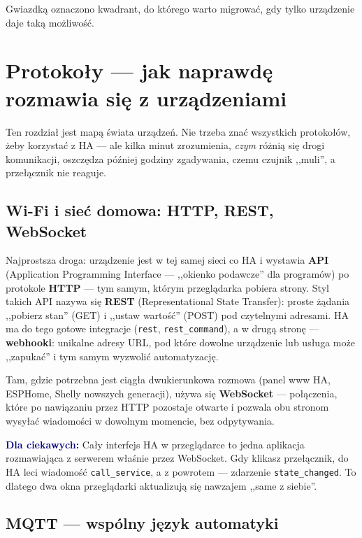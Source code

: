 \documentclass[11pt,a4paper]{article}
\newcommand{\ciekawostka}[1]{\par\medskip\noindent\textcolor{navy}{\textbf{Dla ciekawych:}} #1\par\medskip}
\begin{document}
Gwiazdką oznaczono kwadrant, do którego warto migrować, gdy tylko urządzenie daje taką możliwość.

\section{Protokoły --- jak naprawdę rozmawia się z urządzeniami}
\label{sec:protokoly}

Ten rozdział jest mapą świata urządzeń. Nie trzeba znać wszystkich protokołów, żeby korzystać z HA --- ale kilka minut zrozumienia, \emph{czym} różnią się drogi komunikacji, oszczędza później godziny zgadywania, czemu czujnik ,,muli'', a przełącznik nie reaguje.

\subsection{Wi-Fi i sieć domowa: HTTP, REST, WebSocket}

Najprostsza droga: urządzenie jest w tej samej sieci co HA i wystawia \textbf{API} (Application Programming Interface --- ,,okienko podawcze'' dla programów) po protokole \textbf{HTTP} --- tym samym, którym przeglądarka pobiera strony. Styl takich API nazywa się \textbf{REST} (Representational State Transfer): proste żądania ,,pobierz stan'' (GET) i ,,ustaw wartość'' (POST) pod czytelnymi adresami. HA ma do tego gotowe integracje (\texttt{rest}, \texttt{rest\_command}), a w drugą stronę --- \textbf{webhooki}: unikalne adresy URL, pod które dowolne urządzenie lub usługa może ,,zapukać'' i tym samym wyzwolić automatyzację.

Tam, gdzie potrzebna jest ciągła dwukierunkowa rozmowa (panel www HA, ESPHome, Shelly nowszych generacji), używa się \textbf{WebSocket} --- połączenia, które po nawiązaniu przez HTTP pozostaje otwarte i pozwala obu stronom wysyłać wiadomości w dowolnym momencie, bez odpytywania.

\ciekawostka{Cały interfejs HA w przeglądarce to jedna aplikacja rozmawiająca z serwerem właśnie przez WebSocket. Gdy klikasz przełącznik, do HA leci wiadomość \texttt{call\_service}, a z powrotem --- zdarzenie \texttt{state\_changed}. To dlatego dwa okna przeglądarki aktualizują się nawzajem ,,same z siebie''.}

\subsection{MQTT --- wspólny język automatyki}
\label{sec:mqtt}
\end{document}
